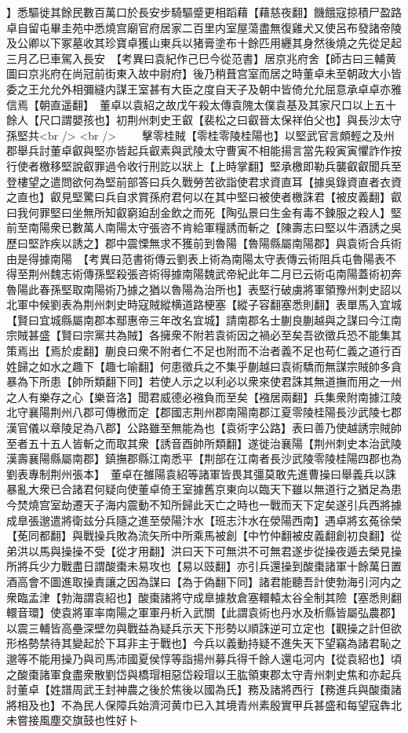 】悉驅徙其餘民數百萬口於長安步騎驅蹙更相蹈藉【藉慈夜翻】饑餓寇掠積尸盈路卓自留屯畢圭苑中悉燒宫廟官府居家二百里内室屋蕩盡無復雞犬又使呂布發諸帝陵及公卿以下冢墓收其珍寶卓獲山東兵以猪膏塗布十餘匹用纒其身然後燒之先從足起　三月乙巳車駕入長安　【考異曰袁紀作己巳今從范書】居京兆府舍【師古曰三輔黄圖曰京兆府在尚冠前街東入故中尉府】後乃稍葺宫室而居之時董卓未至朝政大小皆委之王允允外相彌縫内謀王室甚有大臣之度自天子及朝中皆倚允允屈意承卓卓亦雅信焉【朝直遥翻】　董卓以袁紹之故戊午殺太傳袁隗太僕袁基及其家尺口以上五十餘人【尺口謂嬰孩也】初荆州刺史王叡【裴松之曰叡晉太保祥伯父也】與長沙太守孫堅共<br />
<br />
　　擊零桂賊【零桂零陵桂陽也】以堅武官言頗輕之及州郡舉兵討董卓叡與堅亦皆起兵叡素與武陵太守曹寅不相能揚言當先殺寅寅懼詐作按行使者檄移堅說叡罪過令收行刑訖以狀上【上時掌翻】堅承檄即勒兵襲叡叡聞兵至登樓望之遣問欲何為堅前部答曰兵久戰勞苦欲詣使君求資直耳【據吳錄資直者衣資之直也】叡見堅驚曰兵自求賞孫府君何以在其中堅曰被使者檄誅君【被皮義翻】叡曰我何罪堅曰坐無所知叡窮廹刮金飲之而死【陶弘景曰生金有毒不鍊服之殺人】堅前至南陽衆已數萬人南陽太守張咨不肯給軍糧誘而斬之【陳壽志曰堅以牛酒誘之吳歷曰堅詐疾以誘之】郡中震慄無求不獲前到魯陽【魯陽縣屬南陽郡】與袁術合兵術由是得據南陽　【考異曰范書術傳云劉表上術為南陽太守表傳云術阻兵屯魯陽表不得至荆州魏志術傳孫堅殺張咨術得據南陽魏武帝紀此年二月已云術屯南陽蓋術初奔魯陽此春孫堅取南陽術乃據之猶以魯陽為治所也】表堅行破虜將軍領豫州刺史詔以北軍中候劉表為荆州刺史時寇賊縱横道路梗塞【縱子容翻塞悉則翻】表單馬入宜城【賢曰宜城縣屬南郡本鄢惠帝三年改名宜城】請南郡名士蒯良蒯越與之謀曰今江南宗賊甚盛【賢曰宗黨共為賊】各擁衆不附若袁術因之禍必至矣吾欲徵兵恐不能集其策焉出【焉於䖍翻】蒯良曰衆不附者仁不足也附而不治者義不足也苟仁義之道行百姓歸之如水之趣下【趣七喻翻】何患徵兵之不集乎蒯越曰袁術驕而無謀宗賊帥多貪暴為下所患【帥所類翻下同】若使人示之以利必以衆來使君誅其無道撫而用之一州之人有樂存之心【樂音洛】聞君威德必襁負而至矣【襁居兩翻】兵集衆附南據江陵北守襄陽荆州八郡可傳檄而定【郡國志荆州郡南陽南郡江夏零陵桂陽長沙武陵七郡漢官儀以章陵足為八郡】公路雖至無能為也【袁術字公路】表曰善乃使越誘宗賊帥至者五十五人皆斬之而取其衆【誘音酉帥所類翻】遂徙治襄陽【荆州刺史本治武陵漢壽襄陽縣屬南郡】鎮撫郡縣江南悉平【荆部在江南者長沙武陵零陵桂陽四郡也為劉表專制荆州張本】　董卓在雒陽袁紹等諸軍皆畏其彊莫敢先進曹操曰舉義兵以誅暴亂大衆已合諸君何疑向使董卓倚王室據舊京東向以臨天下雖以無道行之猶足為患今焚燒宫室劫遷天子海内震動不知所歸此天亡之時也一戰而天下定矣遂引兵西將據成臯張邈遣將衛兹分兵隨之進至滎陽汴水【班志汴水在滎陽西南】遇卓將玄菟徐榮【莬同都翻】與戰操兵敗為流矢所中所乘馬被創【中竹仲翻被皮義翻創初良翻】從弟洪以馬與操操不受【從才用翻】洪曰天下可無洪不可無君遂步從操夜遁去榮見操所將兵少力戰盡日謂酸棗未易攻也【易以豉翻】亦引兵還操到酸棗諸軍十餘萬日置酒高會不圖進取操責讓之因為謀曰【為于偽翻下同】諸君能聽吾計使勃海引河内之衆臨孟津【勃海謂袁紹也】酸棗諸將守成臯據敖倉塞轘轅太谷全制其險【塞悉則翻轘音環】使袁將軍率南陽之軍軍丹析入武關【此謂袁術也丹水及析縣皆屬弘農郡】以震三輔皆高壘深壁勿與戰益為疑兵示天下形勢以順誅逆可立定也【觀操之計但欲形格勢禁待其變起於下耳非主于戰也】今兵以義動持疑不進失天下望竊為諸君恥之邈等不能用操乃與司馬沛國夏侯惇等詣揚州募兵得千餘人還屯河内【從袁紹也】頃之酸棗諸軍食盡衆散劉岱與橋瑁相惡岱殺瑁以王肱領東郡太守青州刺史焦和亦起兵討董卓【姓譜周武王封神農之後於焦後以國為氏】務及諸將西行【務進兵與酸棗諸將相及也】不為民人保障兵始濟河黄巾已入其境青州素殷實甲兵甚盛和每望寇犇北未嘗接風塵交旗鼓也性好卜